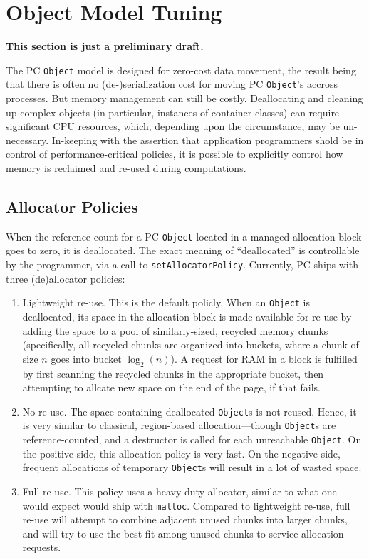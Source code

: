 \section{Object Model Tuning}

\noindent
\textbf{This section is just a preliminary draft.}

\vspace{5 pt}
\noindent
The PC \texttt{Object} model is designed for zero-cost data movement, the result being that there is often no (de-)serialization cost
for moving PC \texttt{Object}'s accross processes.  But memory management can still be costly.  Deallocating and cleaning
up complex objects (in particular, instances of container classes) can require significant CPU resources, which, depending upon the 
circumstance, may be un-necessary.  In-keeping with the assertion that application programmers shold be in
control of performance-critical policies, it is possible to explicitly control how memory is reclaimed and re-used during computations.

\subsection{Allocator Policies}

When the reference count for a PC \texttt{Object} located in a managed allocation block goes to zero, it is deallocated.  The exact
meaning of ``deallocated'' is controllable by the programmer, via a call to \texttt{setAllocatorPolicy}.  Currently, PC ships with
three (de)allocator policies:

\begin{enumerate}

\item Lightweight re-use.  This is the default policly.  When an \texttt{Object} is deallocated, its space in the allocation block is made available for re-use by
adding the space to a pool of similarly-sized, recycled memory chunks (specifically, all recycled chunks are organized into buckets, where a chunk of size
$n$ goes into bucket $\log_2 (n)$).  A request for RAM in a block is fulfilled by first scanning the recycled chunks in the appropriate bucket, then
attempting to allcate new space on the end of the page, if that fails.
\item No re-use.  The space containing deallocated \texttt{Object}s is not-reused.  Hence, it is very similar to classical, region-based allocation---though \texttt{Object}s
are reference-counted, and a destructor is called for each unreachable \texttt{Object}.
On the positive side, this allocation policy is very fast.  On the negative side, frequent allocations of temporary \texttt{Object}s will result in a lot of wasted space.
\item Full re-use.  This policy uses a heavy-duty allocator, similar to what one would expect would ship with \texttt{malloc}.  Compared to lightweight
re-use, full re-use will attempt to combine adjacent unused chunks into larger chunks, and will try to use the best fit among unused chunks to service
allocation requests.

\end{enumerate}

